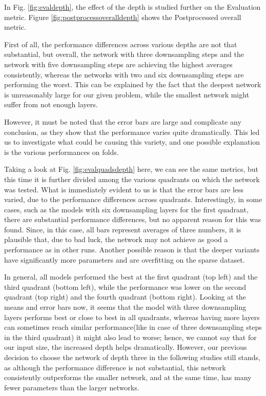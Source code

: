 \documentclass[
  digital,     %
  oneside,     %
  nosansbold,  %
  nocolorbold, %
  lof,         %
  lot,         %
]{fithesis4}
\begin{document}
In Fig. \ref{fig:evaldepth}, the effect of the depth is studied further on the Evaluation metric. Figure \ref{fig:postprocessoveralldepth} shows the Postprocessed overall metric.

First of all, the performance differences across various depths are not that substantial, but overall, the network with three downsampling steps and the network with five downsampling steps are achieving the highest averages consistently, whereas the networks with two and six downsampling steps are performing the worst. This can be explained by the fact that the deepest network is unreasonably large for our given problem, while the smallest network might suffer from not enough layers.

However, it must be noted that the error bars are large and complicate any conclusion, as they show that the performance varies quite dramatically. This led us to investigate what could be causing this variety, and one possible explanation is the various performances on folds.

Taking a look at Fig. \ref{fig:evalquadsdepth} here, we can see the same metrics, but this time it is further divided among the various quadrants on which the network was tested. What is immediately evident to us is that the error bars are less varied, due to the performance differences across quadrants. Interestingly, in some cases, such as the models with six downsampling layers for the first quadrant, there are substantial performance differences, but no apparent reason for this was found. Since, in this case, all bars represent averages of three numbers, it is plausible that, due to bad luck, the network may not achieve as good a performance as in other runs. Another possible reason is that the deeper variants have significantly more parameters and are overfitting on the sparse dataset.

In general, all models performed the best at the first quadrant (top left) and the third quadrant (bottom left), while the performance was lower on the second quadrant (top right) and the fourth quadrant (bottom right). Looking at the means and error bars now, it seems that the model with three downsampling layers performs best or close to best in all quadrants, whereas having more layers can sometimes reach similar performance(like in case of three downsampling steps in the third quadrant) it might also lead to worse; hence, we cannot say that for our input size, the increased depth helps dramatically. However, our previous decision to choose the network of depth three in the following studies still stands, as although the performance difference is not substantial, this network consistently outperforms the smaller network, and at the same time, has many fewer parameters than the larger networks.
\end{document}

